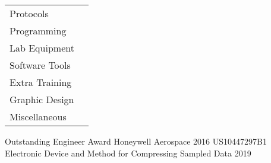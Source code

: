 \documentclass[]{awesome-cv}
\begin{document}
\begin{cventries}
	\cventry
	{\def\arraystretch{1.5}{\begin{tabular}{ l l}
		Protocols  & {\skill{ Ethernet, USB, WiFi, BT, I2C, SPI, HDMI, MIPI, GPS, UART, PCIe, CAN, LCD/XGA}} \\
		Programming  & {\skill{ Python, PowerShell, VB.NET, Java, MATLAB, Arduino, Git, Subversion, TestStand, ADB, VISA}} \\
		Lab Equipment  & {\skill{ Oscilloscopes, multimeters, spectrum/network/logic analyzers, power supplies, Raspberry Pi, Arduino, PXI, DAQ}} \\
		Software Tools  & {\skill{ Schematic capture, PCB layout, Mentor Graphics, CADSTAR, OrCad, Cadence, Allegro, SPICE, Solidworks}} \\
		Extra Training  & {\skill{ Advanced GNSS/GPS, Radar Systems Certificate, MIL-STD 1553, Six Sigma Green Belt}} \\
		Graphic Design  & {\skill{ Adobe Photoshop, Adobe Illustrator, \LaTeX, HTML, CSS, Bootstrap}} \\
		Miscellaneous  & {\skill{ MS Office, Android, Linux, Windows, Atlassian suite, Azure DevOps}} \\
		\end{tabular}}}
	{}
	{}
	{}
	{}
\end{cventries}
\vspace{-6mm}

\begin{cvhonors}
	\cvhonor
	{Outstanding Engineer Award}
	{Honeywell Aerospace }
	{}
	{2016}
	\cvhonor
	{US10447297B1}
	{Electronic Device and Method for Compressing Sampled Data }
	{}
	{2019}
\end{cvhonors}
\end{document}
